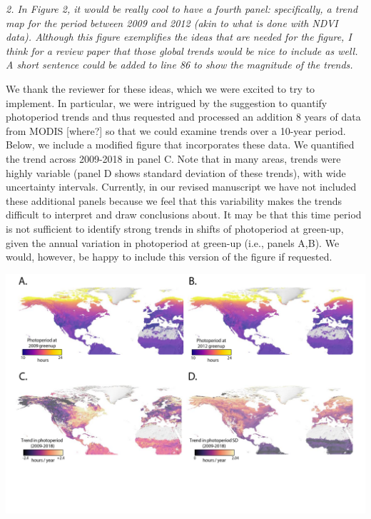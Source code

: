 \documentclass{article}
\begin{document}
\par \emph{2. In Figure 2, it would be really cool to have a fourth panel: specifically, a trend map for the period between 2009 and 2012 (akin to what is done with NDVI data). Although this figure exemplifies the ideas that are needed for the figure, I think for a review paper that those global trends would be nice to include as well. A short sentence could be added to line 86 to show the magnitude of the trends. }
\par We thank the reviewer for these ideas, which we were excited to try to implement. In particular,  we were intrigued by the suggestion to quantify photoperiod trends and thus requested and processed an addition 8 years of data from MODIS [where?] so that we could examine trends over a 10-year period. Below, we include a modified figure that incorporates these data. We quantified the trend across 2009-2018 in panel C. Note that in many areas, trends were highly variable (panel D shows standard deviation of these trends), with wide uncertainty intervals. Currently, in our revised manuscript we have not included these additional panels because we feel that this variability makes the trends difficult to interpret and draw conclusions about.  It may be that this time period is not sufficient to identify strong trends in shifts of photoperiod at green-up, given the annual variation in photoperiod at green-up (i.e., panels A,B). We would, however, be happy to include this version of the figure if requested.
\par
\includegraphics{../figures/Greenup_corr_sm_leg_4panels_sds.pdf} %
\end{document}
